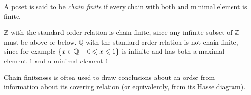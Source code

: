 \documentclass[12pt]{article}
\begin{document}

A poset is said to be \emph{chain finite} if every chain with both 
 and minimal element is finite.

$\mathbb{Z}$ with the standard order relation is chain finite, 
since any infinite subset of $\mathbb{Z}$ must be 
 above or below. 
$\mathbb{Q}$ with the standard order relation is not chain finite, 
since for example 
$\{ x \in\nobreak \mathbb{Q} \,\mid\, 0 \leqslant\nobreak x \leqslant\nobreak 1 \}$ 
is infinite and has both a maximal element $1$ and a minimal element $0$.

Chain finiteness is often used to draw conclusions about an order from information about its covering relation (or equivalently, from its Hasse diagram).
\end{document}
